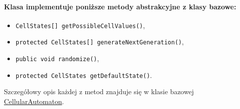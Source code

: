\documentclass{report}
\begin{document}
\paragraph{Klasa implementuje poniższe metody abstrakcyjne z klasy bazowe:}
\begin{itemize}
    \item \texttt{CellStates[] getPossibleCellValues()},
    \item \texttt{protected CellStates[] generateNextGeneration()},
    \item \texttt{public void randomize()},
    \item \texttt{protected CellStates getDefaultState()}.
\end{itemize}
Szczegółowy opis każdej z metod znajduje się w klasie bazowej \hyperref[subsec:cellularAutomaton]{CellularAutomaton}.
\end{document}
